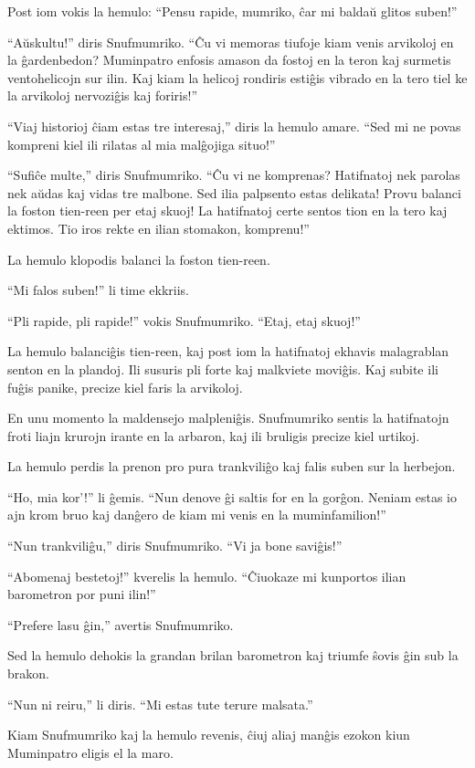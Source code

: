 Post iom vokis la hemulo: ``Pensu rapide, mumriko, ĉar mi baldaŭ glitos suben!''

``Aŭskultu!'' diris Snufmumriko. ``Ĉu vi memoras tiufoje kiam venis arvikoloj en la ĝardenbedon? Muminpatro enfosis amason da fostoj en la teron kaj surmetis ventohelicojn sur ilin. Kaj kiam la helicoj rondiris estiĝis vibrado en la tero tiel ke la arvikoloj nervoziĝis kaj foriris!''

``Viaj historioj ĉiam estas tre interesaj,'' diris la hemulo amare. ``Sed mi ne povas kompreni kiel ili rilatas al mia malĝojiga situo!''

``Sufiĉe multe,'' diris Snufmumriko. ``Ĉu vi ne komprenas? Hatifnatoj nek parolas nek aŭdas kaj vidas tre malbone. Sed ilia palpsento estas delikata! Provu balanci la foston tien-reen per etaj skuoj! La hatifnatoj certe sentos tion en la tero kaj ektimos. Tio iros rekte en ilian stomakon, komprenu!''

La hemulo klopodis balanci la foston tien-reen.

``Mi falos suben!'' li time ekkriis.

``Pli rapide, pli rapide!'' vokis Snufmumriko. ``Etaj, etaj skuoj!''

La hemulo balanciĝis tien-reen, kaj post iom la hatifnatoj ekhavis malagrablan senton en la plandoj. Ili susuris pli forte kaj malkviete moviĝis. Kaj subite ili fuĝis panike, precize kiel faris la arvikoloj.

En unu momento la maldensejo malpleniĝis. Snufmumriko sentis la hatifnatojn froti liajn krurojn irante en la arbaron, kaj ili bruligis precize kiel urtikoj.

La hemulo perdis la prenon pro pura trankviliĝo kaj falis suben sur la herbejon.

``Ho, mia kor'!'' li ĝemis. ``Nun denove ĝi saltis for en la gorĝon. Neniam estas io ajn krom bruo kaj danĝero de kiam mi venis en la muminfamilion!''

``Nun trankviliĝu,'' diris Snufmumriko. ``Vi ja bone saviĝis!''

``Abomenaj bestetoj!'' kverelis la hemulo. ``Ĉiuokaze mi kunportos ilian barometron por puni ilin!''

``Prefere lasu ĝin,'' avertis Snufmumriko.

Sed la hemulo dehokis la grandan brilan barometron kaj triumfe ŝovis ĝin sub la brakon.

``Nun ni reiru,'' li diris. ``Mi estas tute terure malsata.''

Kiam Snufmumriko kaj la hemulo revenis, ĉiuj aliaj manĝis ezokon kiun Muminpatro eligis el la maro.

